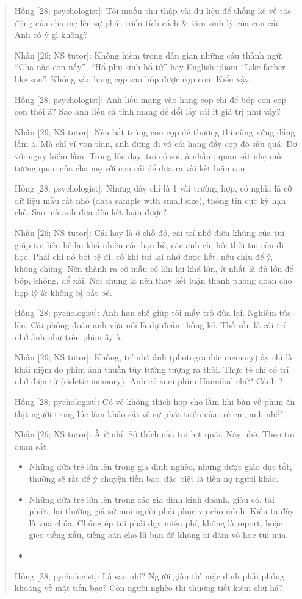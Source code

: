 \documentclass[12pt,oneside]{book}
\begin{document}
\begin{quote}
	{\sf Hồng [28; psychologist]}: Tôi muốn thu thập vài dữ liệu để thống kê về tác động của cha mẹ lên sự phát triển tích cách \& tâm sinh lý của con cái. Anh có ý gì không?

	{\sf Nhân [26; NS tutor]}: Không hiếm trong dân gian những câu thành ngữ: ``Cha nào con nấy'', ``Hổ phụ sinh hổ tử'' hay English idiom ``Like father like son''. Không vào hang cọp sao bóp được cọp con. Kiểu vậy.
	
	{\sf Hồng [28; psychologist]}: Anh liều mạng vào hang cọp chỉ để bóp con cọp con thôi á? Sao anh liều cả tính mạng để đổi lấy cái ít giá trị như vậy?
	
	{\sf Nhân [26; NS tutor]}: Nếu bắt trúng con cọp dễ thương thì cũng xứng đáng lắm á. Mà chỉ ví von thui, anh đừng đi vô cái hang đầy cọp đó sâu quá. Dơ với nguy hiểm lắm. Trong lúc dạy, tui có soi, à nhầm, quan sát nhẹ mối tương quan của cha mẹ với con cái để đưa ra vài kết luận sau.
	
	{\sf Hồng [28; psychologist]}: Nhưng đấy chỉ là 1 vài trường hợp, có nghĩa là cỡ dữ liệu mẫu rất nhỏ (data sample with small size), thông tin cực kỳ hạn chế. Sao mà anh đưa đến kết luận được?
	
	{\sf Nhân [26; NS tutor]}: Cái hay là ở chỗ đó, cái trí nhớ điên khùng của tui giúp tui liên hệ lại khá nhiều các bạn bè, các anh chị hồi thời tui còn đi học. Phải chi nó bớt tệ đi, có khi tui lại nhớ được hết, nếu chịu để ý, không chừng. Nên thành ra cỡ mẫu có khi lại khá lớn, ít nhất là đủ lớn để bóp, không, để xài. Nói chung là nên thay kết luận thành phỏng đoán cho hợp lý \& không bị bắt bẻ.
	
	{\sf Hồng [28; pychologist]}: Anh hạn chế giúp tôi mấy trò đùa lại. Nghiêm túc lên. Cái phỏng đoán anh vừa nói là dự đoán thống kê. Thế vẫn là cái trí nhớ ảnh như trên phim ấy à.
	
	{\sf Nhân [26; NS tutor]}: Không, trí nhớ ảnh (photographic memory) ấy chỉ là khái niệm do phim ảnh thuần túy tưởng tượng ra thôi. Thực tế chỉ có trí nhớ điện tử (eidetic memory). Anh có xem phim Hannibal chứ? Cảnh ?
	
	{\sf Hồng [28; pychologist]}: Có vẻ không thích hợp cho lắm khi bàn về phim ăn thịt người trong lúc làm khảo sát về sự phát triển của trẻ em, anh nhể?
	
	{\sf Nhân [26; NS tutor]}: À ừ nhỉ. Sở thích của tui hơi quái. Này nhé. Theo tui quan sát.
	\begin{itemize}
		\item Những đứa trẻ lớn lên trong gia đình nghèo, nhưng được giáo dục tốt, thường sẽ rất để ý chuyện tiền bạc, đặc biệt là tiền nợ người khác.
		\item Những đứa trẻ lớn lên trong các gia đình kinh doanh, giàu có, tài phiệt, lại thường giả sử mọi người phải phục vụ cho mình. Kiểu ta đây là vua chúa. Chúng ép tui phải dạy miễn phí, không là report, hoặc gieo tiếng xấu, tiếng oán cho lũ bạn để không ai dám vô học tui nữa.
		\item 
	\end{itemize}
	{\sf Hồng [28; pychologist]}: Là sao nhỉ? Người giàu thì mặc định phải phóng khoáng về mặt tiền bạc? Còn người nghèo thì thường tiết kiệm chứ hả?
	

\end{quote}
\end{document}
